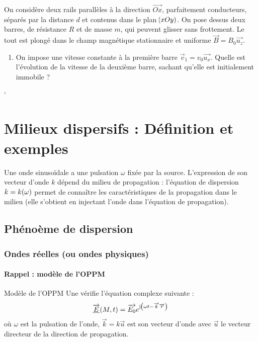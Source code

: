 \documentclass[a4paper,french,bookmarks]{book}
\newcommand{\chaptertoc}[0]{
    \setcounter{tocdepth}{2}
    \begin{tcolorbox}[
        enhanced,
        frame hidden,
        sharp corners,
        detach title,
        spread outwards     = 5pt,
        halign              = center,
        valign              = center,
        borderline west     = {3pt}{0pt}{main20!50!main2!95!gray!90},
        coltitle            = main20!50!main2!95!gray!90, 
        interior style      = {
            left color      = main1white2!65!gray!11,
            middle color    = main1white2!50!gray!10,
            right color     = main1white2!35!gray!9
        },
        arc                 = 0 cm,
        title               = SOMMAIRE,
        boxrule             = 0pt,
        fonttitle           = \bfseries\sffamily,
        overlay             = {
            \node[rotate=90, minimum width=1cm, anchor=south,yshift=-0.8cm]
            at (frame.west) {\tcbtitle};
        }
    ]
        \begin{minipage}{0.83\linewidth}
            \sffamily
            \minitoc
        \end{minipage}
    \end{tcolorbox}
}
\begin{document}
    On considère deux rails parallèles à la direction $\vec{Ox}$, parfaitement conducteurs, séparés par la distance $d$ et contenus dans le plan $\!\left(xOy\right)$. On pose dessus deux barres, de résistance $R$ et de masse $m$, qui peuvent glisser sans frottement. Le tout est plongé dans le champ magnétique stationnaire et uniforme $\vec B = B_0\vec{u_z}$.
    
    \begin{enumerate}
        \item On impose une vitesse constante à la première barre $\vec v_1 = v_0\vec{u_x}$. Quelle est l'évolution de la vitesse de la deuxième barre, sachant qu'elle est initialement immobile ?
        
        
    \end{enumerate}
    
    `\chapter{Milieux dispersifs : Définition et exemples}
    
    Une onde sinusoïdale a une pulsation $\omega$ fixée par la source. L'expression de son vecteur d'onde $k$ dépend du milieu de propagation : l'équation de dispersion $k = k\!\left(\omega\right)$ permet de connaître les caractéristiques de la propagation dans le milieu (elle s'obtient en injectant l'onde dans l'équation de propagation).
    
    \chaptertoc
    
    \section{Phénoème de dispersion}
    
    \subsection{Ondes réelles (ou ondes physiques)}
    
    \subsubsection{Rappel : modèle de l'OPPM}
    
    \begin{form}{Modèle de l'OPPM}
        Une  vérifie l'équation complexe suivante :
        \[ \underline{\overrightarrow{E}}\!\left(M, t\right) = \overrightarrow{E_0}e^{\mathrm{j\mkern1mu}\!\left(\omega t - \overrightarrow{k} \overrightarrow{r}\right)}\]
        où $\omega$ est la pulsation de l'onde, $\vec k = k\vec{u}$ est son vecteur d'onde avec $\vec u$ le vecteur directeur de la direction de propagation.
    \end{form}
    
\end{document}

